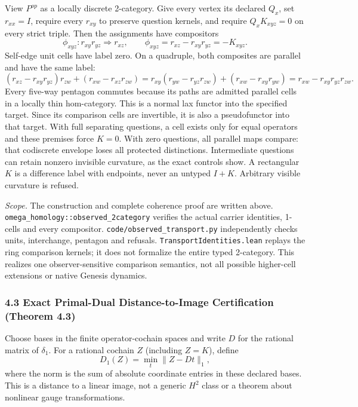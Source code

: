 \documentclass[
  english,
  10pt,
  a4paper,
]{article}
\begin{document}
View \(P^{op}\) as a locally discrete 2-category. Give every vertex its
declared \(Q_x\), set \(r_{xx}=I\), require every \(r_{xy}\) to preserve
question kernels, and require \(Q_xK_{xyz}=0\) on every strict triple.
Then the assignments have compositors \[
\phi_{xyz}:r_{xy}r_{yz}\Rightarrow r_{xz},\qquad
\phi_{xyz}=r_{xz}-r_{xy}r_{yz}=-K_{xyz}.
\] Self-edge unit cells have label zero. On a quadruple, both composites
are parallel and have the same label: \[
(r_{xz}-r_{xy}r_{yz})r_{zw}+(r_{xw}-r_{xz}r_{zw})
=r_{xy}(r_{yw}-r_{yz}r_{zw})+(r_{xw}-r_{xy}r_{yw})
=r_{xw}-r_{xy}r_{yz}r_{zw}.
\] Every five-way pentagon commutes because its paths are admitted
parallel cells in a locally thin hom-category. This is a normal lax
functor into the specified target. Since its comparison cells are
invertible, it is also a pseudofunctor into that target. With full
separating questions, a cell exists only for equal operators and these
premises force \(K=0\). With zero questions, all parallel maps compare:
that codiscrete envelope loses all protected distinctions. Intermediate
questions can retain nonzero invisible curvature, as the exact controls
show. A rectangular \(K\) is a difference label with endpoints, never an
untyped \(I+K\). Arbitrary visible curvature is refused.

\emph{Scope.} The construction and complete coherence proof are written
above. \nolinkurl{omega_homology::observed_2category} verifies the
actual carrier identities, 1-cells and every compositor.
\nolinkurl{code/observed_transport.py} independently checks units,
interchange, pentagon and refusals. \texttt{TransportIdentities.lean}
replays the ring comparison kernels; it does not formalize the entire
typed 2-category. This realizes one observer-sensitive comparison
semantics, not all possible higher-cell extensions or native Genesis
dynamics.

\subsubsection{4.3 Exact Primal-Dual Distance-to-Image Certification
(Theorem
4.3)}\label{exact-primal-dual-distance-to-image-certification-theorem-4.3}

Choose bases in the finite operator-cochain spaces and write \(D\) for
the rational matrix of \(\delta_1\). For a rational cochain \(Z\)
(including \(Z=K\)), define \[
D_1(Z)=\min_t\|Z-Dt\|_1,
\] where the norm is the sum of absolute coordinate entries in these
declared bases. This is a distance to a linear image, not a generic
\(H^2\) class or a theorem about nonlinear gauge transformations.
\end{document}
